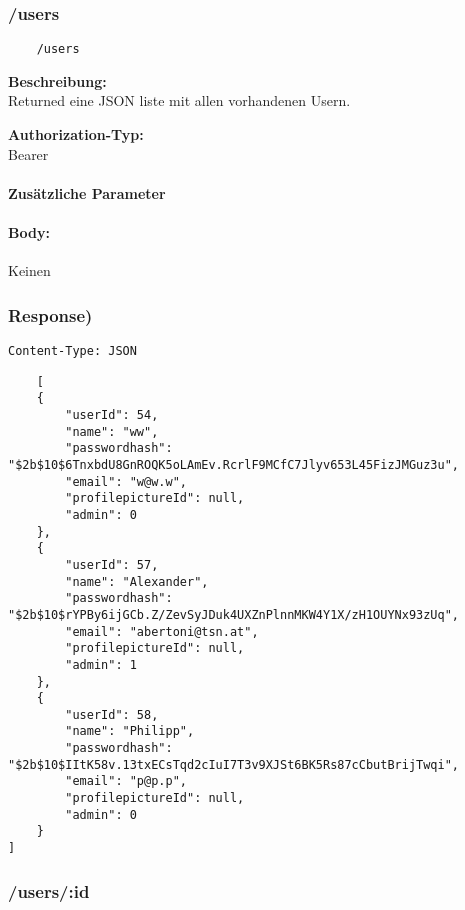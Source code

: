 \label{/users}

\subsubsection{/users}

\begin{lstlisting}
    /users
\end{lstlisting}

\textbf{Beschreibung:} \\
Returned eine JSON liste mit allen vorhandenen Usern.

\textbf{Authorization-Typ:} \\
Bearer

\paragraph{Zusätzliche Parameter}


\paragraph{Body:}

Keinen

\subsubsection{Response)}

\lstinline{Content-Type: JSON}
\begin{lstlisting}
    [
    {
        "userId": 54,
        "name": "ww",
        "passwordhash": "$2b$10$6TnxbdU8GnROQK5oLAmEv.RcrlF9MCfC7Jlyv653L45FizJMGuz3u",
        "email": "w@w.w",
        "profilepictureId": null,
        "admin": 0
    },
    {
        "userId": 57,
        "name": "Alexander",
        "passwordhash": "$2b$10$rYPBy6ijGCb.Z/ZevSyJDuk4UXZnPlnnMKW4Y1X/zH1OUYNx93zUq",
        "email": "abertoni@tsn.at",
        "profilepictureId": null,
        "admin": 1
    },
    {
        "userId": 58,
        "name": "Philipp",
        "passwordhash": "$2b$10$IItK58v.13txECsTqd2cIuI7T3v9XJSt6BK5Rs87cCbutBrijTwqi",
        "email": "p@p.p",
        "profilepictureId": null,
        "admin": 0
    }
]
\end{lstlisting}

\pagebreak

\subsubsection{/users/:id}

